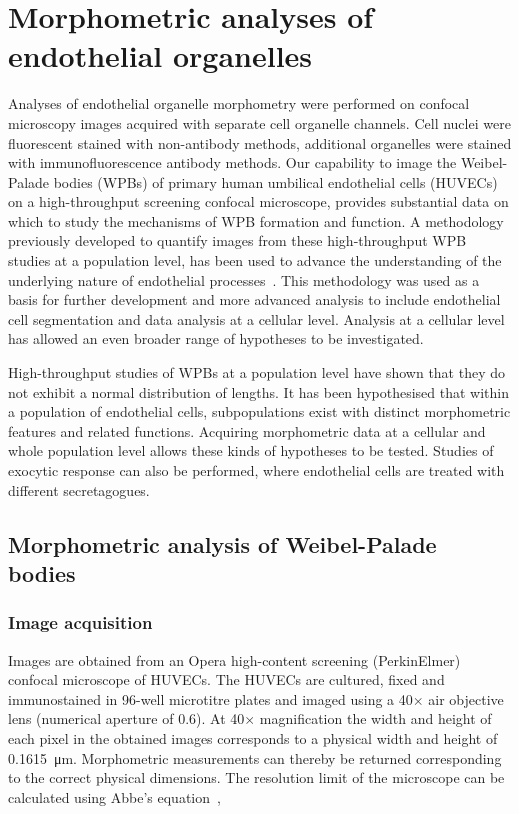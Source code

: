 \ifpdf
	\graphicspath{{chapter_2/figs/}}
\fi
\chapter{Morphometric analyses of endothelial organelles}
Analyses of endothelial organelle morphometry were performed on confocal microscopy images acquired with separate cell organelle channels. Cell nuclei were fluorescent stained with non-antibody methods, additional organelles were stained with immunofluorescence antibody methods.
Our capability to image the Weibel-Palade bodies (WPBs) of primary human umbilical endothelial cells (HUVECs) on a high-throughput screening confocal microscope, provides substantial data on which to study the mechanisms of WPB formation and function. A methodology previously developed to quantify images from these high-throughput WPB studies at a population level, has been used to advance the understanding of the underlying nature of endothelial processes~\cite{Ferraro2014,Stevenson2014}. This methodology was used as a basis for further development and more advanced analysis to include endothelial cell segmentation and data analysis at a cellular level. Analysis at a cellular level has allowed an even broader range of hypotheses to be investigated.

High-throughput studies of WPBs at a population level have shown that they do not exhibit a normal distribution of lengths. It has been hypothesised that within a population of endothelial cells, subpopulations exist with distinct morphometric features and related functions. Acquiring morphometric data at a cellular and whole population level allows these kinds of hypotheses to be tested. Studies of exocytic response can also be performed, where endothelial cells are treated with different secretagogues.

\section{Morphometric analysis of Weibel-Palade bodies}
\subsection{Image acquisition}
Images are obtained from an Opera high-content screening (PerkinElmer) confocal microscope of HUVECs. The HUVECs are cultured, fixed and immunostained in 96-well microtitre plates and imaged using a 40$\times$ air objective lens (numerical aperture of 0.6). At 40$\times$ magnification the width and height of each pixel in the obtained images corresponds to a physical width and height of \SI{0.1615}{\micro\meter}. Morphometric measurements can thereby be returned corresponding to the correct physical dimensions. The resolution limit of the microscope can be calculated using Abbe's equation~\cite{Abbe1873},

